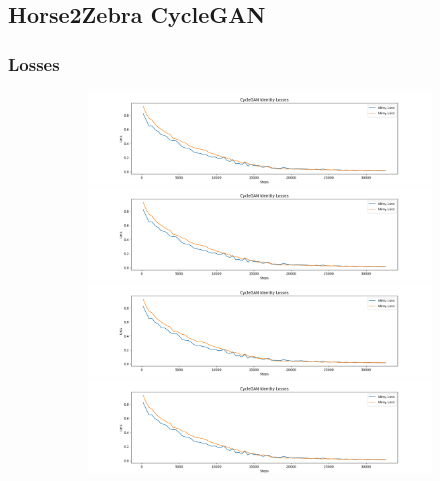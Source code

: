 \documentclass[12pt, fleqn, titlepage]{article}
\begin{document}
\subsection{Horse2Zebra CycleGAN}


\subsubsection{Losses}

\begin{figure}[H]
	\centering
	\begin{subfigure}[b]{0.8\textwidth}
		\centering
		\includegraphics[width=\linewidth]{imgs/placeholder_identity_losses}
		\hfill
		\includegraphics[width=\linewidth]{imgs/placeholder_identity_losses}
		\hfill
		\includegraphics[width=\linewidth]{imgs/placeholder_identity_losses}
		\hfill
		\includegraphics[width=\linewidth]{imgs/placeholder_identity_losses}
	\end{subfigure}
\end{figure}
\end{document}
